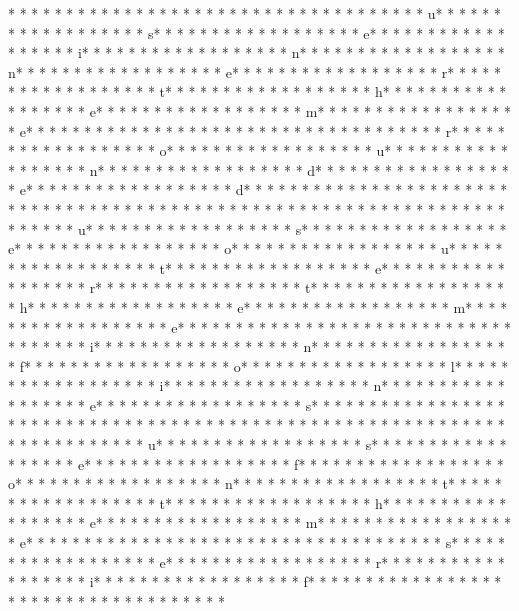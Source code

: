 {* * *  * * *  * * *  *  * * *  *  * * *  *  * * *  * * *  * * *  *  * * *  *  * * *  * u* * *  * * *  * * *  *  * * *  *  * * *  * s* * *  * * *  * * *  *  * * *  *  * * *  * e* * *  * * *  * * *  *  * * *  *  * * *  * i* * *  * * *  * * *  *  * * *  *  * * *  * n* * *  * * *  * * *  *  * * *  *  * * *  * n* * *  * * *  * * *  *  * * *  *  * * *  * e* * *  * * *  * * *  *  * * *  *  * * *  * r* * *  * * *  * * *  *  * * *  *  * * *  * t* * *  * * *  * * *  *  * * *  *  * * *  * h* * *  * * *  * * *  *  * * *  *  * * *  * e* * *  * * *  * * *  *  * * *  *  * * *  * m* * *  * * *  * * *  *  * * *  *  * * *  * e* * *  * * *  * * *  *  * * *  *  * * *  * {* * *  * * *  * * *  *  * * *  *  * * *  * r* * *  * * *  * * *  *  * * *  *  * * *  * o* * *  * * *  * * *  *  * * *  *  * * *  * u* * *  * * *  * * *  *  * * *  *  * * *  * n* * *  * * *  * * *  *  * * *  *  * * *  * d* * *  * * *  * * *  *  * * *  *  * * *  * e* * *  * * *  * * *  *  * * *  *  * * *  * d* * *  * * *  * * *  *  * * *  *  * * *  * }* * *  * * *  * * *  *  * * *  *  * * *  * 
* * *  * * *  * * *  *  * * *  *  * * *  *  * * *  * * *  * * *  *  * * *  *  * * *  * u* * *  * * *  * * *  *  * * *  *  * * *  * s* * *  * * *  * * *  *  * * *  *  * * *  * e* * *  * * *  * * *  *  * * *  *  * * *  * o* * *  * * *  * * *  *  * * *  *  * * *  * u* * *  * * *  * * *  *  * * *  *  * * *  * t* * *  * * *  * * *  *  * * *  *  * * *  * e* * *  * * *  * * *  *  * * *  *  * * *  * r* * *  * * *  * * *  *  * * *  *  * * *  * t* * *  * * *  * * *  *  * * *  *  * * *  * h* * *  * * *  * * *  *  * * *  *  * * *  * e* * *  * * *  * * *  *  * * *  *  * * *  * m* * *  * * *  * * *  *  * * *  *  * * *  * e* * *  * * *  * * *  *  * * *  *  * * *  * {* * *  * * *  * * *  *  * * *  *  * * *  * i* * *  * * *  * * *  *  * * *  *  * * *  * n* * *  * * *  * * *  *  * * *  *  * * *  * f* * *  * * *  * * *  *  * * *  *  * * *  * o* * *  * * *  * * *  *  * * *  *  * * *  * l* * *  * * *  * * *  *  * * *  *  * * *  * i* * *  * * *  * * *  *  * * *  *  * * *  * n* * *  * * *  * * *  *  * * *  *  * * *  * e* * *  * * *  * * *  *  * * *  *  * * *  * s* * *  * * *  * * *  *  * * *  *  * * *  * }* * *  * * *  * * *  *  * * *  *  * * *  * 
* * *  * * *  * * *  *  * * *  *  * * *  *  * * *  * * *  * * *  *  * * *  *  * * *  * u* * *  * * *  * * *  *  * * *  *  * * *  * s* * *  * * *  * * *  *  * * *  *  * * *  * e* * *  * * *  * * *  *  * * *  *  * * *  * f* * *  * * *  * * *  *  * * *  *  * * *  * o* * *  * * *  * * *  *  * * *  *  * * *  * n* * *  * * *  * * *  *  * * *  *  * * *  * t* * *  * * *  * * *  *  * * *  *  * * *  * t* * *  * * *  * * *  *  * * *  *  * * *  * h* * *  * * *  * * *  *  * * *  *  * * *  * e* * *  * * *  * * *  *  * * *  *  * * *  * m* * *  * * *  * * *  *  * * *  *  * * *  * e* * *  * * *  * * *  *  * * *  *  * * *  * {* * *  * * *  * * *  *  * * *  *  * * *  * s* * *  * * *  * * *  *  * * *  *  * * *  * e* * *  * * *  * * *  *  * * *  *  * * *  * r* * *  * * *  * * *  *  * * *  *  * * *  * i* * *  * * *  * * *  *  * * *  *  * * *  * f* * *  * * *  * * *  *  * * *  *  * * *  * }* * *  * * *  * * *  *  * * *  *  * * *  * 
}
